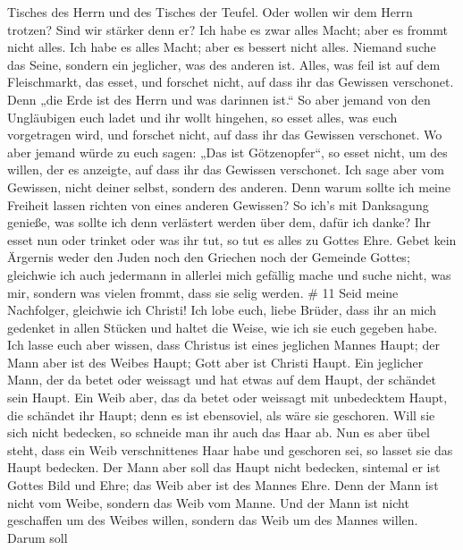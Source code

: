 Tisches des Herrn und des Tisches der Teufel.  Oder wollen
wir dem Herrn trotzen? Sind wir stärker denn er?  Ich habe
es zwar alles Macht; aber es frommt nicht alles. Ich habe es alles
Macht; aber es bessert nicht alles.  Niemand suche das
Seine, sondern ein jeglicher, was des anderen ist.  Alles,
was feil ist auf dem Fleischmarkt, das esset, und forschet nicht, auf
dass ihr das Gewissen verschonet.  Denn „die Erde ist des
Herrn und was darinnen ist.``  So aber jemand von den
Ungläubigen euch ladet und ihr wollt hingehen, so esset alles, was euch
vorgetragen wird, und forschet nicht, auf dass ihr das Gewissen
verschonet.  Wo aber jemand würde zu euch sagen: „Das ist
Götzenopfer``, so esset nicht, um des willen, der es anzeigte, auf dass
ihr das Gewissen verschonet.  Ich sage aber vom Gewissen,
nicht deiner selbst, sondern des anderen. Denn warum sollte ich meine
Freiheit lassen richten von eines anderen Gewissen?  So
ich's mit Danksagung genieße, was sollte ich denn verlästert werden über
dem, dafür ich danke?  Ihr esset nun oder trinket oder was
ihr tut, so tut es alles zu Gottes Ehre.  Gebet kein
Ärgernis weder den Juden noch den Griechen noch der Gemeinde Gottes;
 gleichwie ich auch jedermann in allerlei mich gefällig
mache und suche nicht, was mir, sondern was vielen frommt, dass sie
selig werden. \# 11  Seid meine Nachfolger, gleichwie ich
Christi!  Ich lobe euch, liebe Brüder, dass ihr an mich
gedenket in allen Stücken und haltet die Weise, wie ich sie euch gegeben
habe.  Ich lasse euch aber wissen, dass Christus ist eines
jeglichen Mannes Haupt; der Mann aber ist des Weibes Haupt; Gott aber
ist Christi Haupt.  Ein jeglicher Mann, der da betet oder
weissagt und hat etwas auf dem Haupt, der schändet sein Haupt.
 Ein Weib aber, das da betet oder weissagt mit unbedecktem
Haupt, die schändet ihr Haupt; denn es ist ebensoviel, als wäre sie
geschoren.  Will sie sich nicht bedecken, so schneide man
ihr auch das Haar ab. Nun es aber übel steht, dass ein Weib
verschnittenes Haar habe und geschoren sei, so lasset sie das Haupt
bedecken.  Der Mann aber soll das Haupt nicht bedecken,
sintemal er ist Gottes Bild und Ehre; das Weib aber ist des Mannes Ehre.
 Denn der Mann ist nicht vom Weibe, sondern das Weib vom
Manne.  Und der Mann ist nicht geschaffen um des Weibes
willen, sondern das Weib um des Mannes willen.  Darum soll
